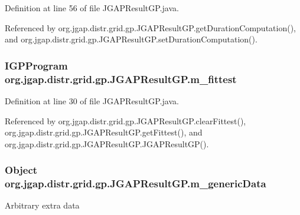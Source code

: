 Definition at line 56 of file J\-G\-A\-P\-Result\-G\-P.\-java.



Referenced by org.\-jgap.\-distr.\-grid.\-gp.\-J\-G\-A\-P\-Result\-G\-P.\-get\-Duration\-Computation(), and org.\-jgap.\-distr.\-grid.\-gp.\-J\-G\-A\-P\-Result\-G\-P.\-set\-Duration\-Computation().

\hypertarget{classorg_1_1jgap_1_1distr_1_1grid_1_1gp_1_1_j_g_a_p_result_g_p_a778660c9e78b772b7471b4635555bfc8}{
\subsubsection[{m\-\_\-fittest}]{\setlength{\rightskip}{0pt plus 5cm}I\-G\-P\-Program org.\-jgap.\-distr.\-grid.\-gp.\-J\-G\-A\-P\-Result\-G\-P.\-m\-\_\-fittest\hspace{0.3cm}{\ttfamily [private]}}}\label{classorg_1_1jgap_1_1distr_1_1grid_1_1gp_1_1_j_g_a_p_result_g_p_a778660c9e78b772b7471b4635555bfc8}


Definition at line 30 of file J\-G\-A\-P\-Result\-G\-P.\-java.



Referenced by org.\-jgap.\-distr.\-grid.\-gp.\-J\-G\-A\-P\-Result\-G\-P.\-clear\-Fittest(), org.\-jgap.\-distr.\-grid.\-gp.\-J\-G\-A\-P\-Result\-G\-P.\-get\-Fittest(), and org.\-jgap.\-distr.\-grid.\-gp.\-J\-G\-A\-P\-Result\-G\-P.\-J\-G\-A\-P\-Result\-G\-P().

\hypertarget{classorg_1_1jgap_1_1distr_1_1grid_1_1gp_1_1_j_g_a_p_result_g_p_acbf328c451633bd794bad68c3cc2fb9b}{
\subsubsection[{m\-\_\-generic\-Data}]{\setlength{\rightskip}{0pt plus 5cm}Object org.\-jgap.\-distr.\-grid.\-gp.\-J\-G\-A\-P\-Result\-G\-P.\-m\-\_\-generic\-Data\hspace{0.3cm}{\ttfamily [private]}}}\label{classorg_1_1jgap_1_1distr_1_1grid_1_1gp_1_1_j_g_a_p_result_g_p_acbf328c451633bd794bad68c3cc2fb9b}
Arbitrary extra data 

